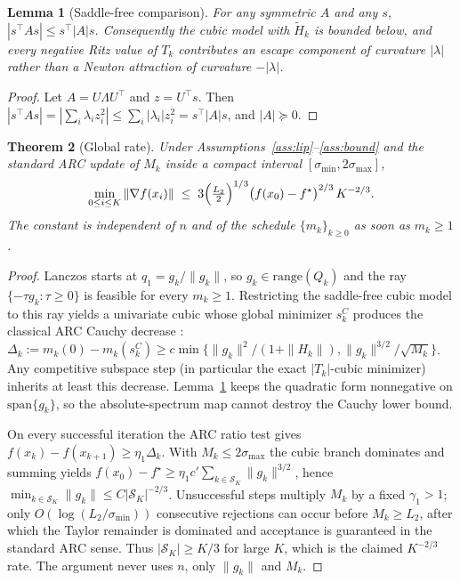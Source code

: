 \documentclass[11pt,a4paper]{article}
\newtheorem{theorem}{Theorem}
\newtheorem{lemma}[theorem]{Lemma}
\theoremstyle{definition}
\begin{document}
\begin{lemma}[Saddle-free comparison]\label{lem:sf}
For any symmetric $A$ and any $s$, $|s^\top A s|\le s^\top |A|s$.
Consequently the cubic model with $\widetilde H_k$ is bounded below, and
every negative Ritz value of $T_k$ contributes an \emph{escape} component
of curvature $|\lambda|$ rather than a Newton attraction of curvature
$-|\lambda|$.
\end{lemma}

\begin{proof}
Let $A=U\Lambda U^\top$ and $z=U^\top s$. Then
$|s^\top A s|=|\sum_i\lambda_i z_i^2|\le\sum_i|\lambda_i|z_i^2=s^\top|A|s$,
and $|A|\succeq 0$.
\end{proof}

\begin{theorem}[Global rate]\label{thm:global}
Under Assumptions~\ref{ass:lip}--\ref{ass:bound} and the standard ARC update
of $M_k$ inside a compact interval $[\sigma_{\min},2\sigma_{\max}]$,
\[
\min_{0\le i\le K}\|\nabla f(x_i)\|
\;\le\;
3\Bigl(\tfrac{L_2}{2}\Bigr)^{1/3}\bigl(f(x_0)-f^\star\bigr)^{2/3}\,K^{-2/3}.
\]
The constant is independent of $n$ and of the schedule $\{m_k\}_{k\ge 0}$
as soon as $m_k\ge 1$.
\end{theorem}

\begin{proof}
Lanczos starts at $q_1=g_k/\|g_k\|$, so $g_k\in\mathrm{range}(Q_k)$ and the
ray $\{-\tau g_k:\tau\ge 0\}$ is feasible for every $m_k\ge 1$. Restricting
the saddle-free cubic model to this ray yields a univariate cubic whose
global minimizer $s_k^C$ produces the classical ARC Cauchy decrease
\cite[Lem.~2.1]{cartis2011}:
$\Delta_k:=m_k(0)-m_k(s_k^C)\ge c\min\bigl\{\|g_k\|^2/(1+\|H_k\|),
\|g_k\|^{3/2}/\sqrt{M_k}\bigr\}$.
Any competitive subspace step (in particular the exact $|T_k|$-cubic
minimizer) inherits at least this decrease. Lemma~\ref{lem:sf} keeps the
quadratic form nonnegative on $\mathrm{span}\{g_k\}$, so the absolute-spectrum
map cannot destroy the Cauchy lower bound.

On every successful iteration the ARC ratio test gives
$f(x_k)-f(x_{k+1})\ge\eta_1\Delta_k$. With $M_k\le 2\sigma_{\max}$ the cubic
branch dominates and summing yields
$f(x_0)-f^\star\ge\eta_1 c'\sum_{k\in\mathcal{S}_K}\|g_k\|^{3/2}$, hence
$\min_{k\in\mathcal{S}_K}\|g_k\|\le C|\mathcal{S}_K|^{-2/3}$.
Unsuccessful steps multiply $M_k$ by a fixed $\gamma_1>1$; only
$O(\log(L_2/\sigma_{\min}))$ consecutive rejections can occur before
$M_k\ge L_2$, after which the Taylor remainder is dominated and acceptance
is guaranteed in the standard ARC sense. Thus $|\mathcal{S}_K|\ge K/3$ for
large $K$, which is the claimed $K^{-2/3}$ rate. The argument never uses
$n$, only $\|g_k\|$ and $M_k$.
\end{proof}
\end{document}
